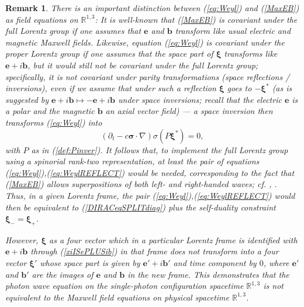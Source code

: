 \documentclass[11pt]{article}
\theoremstyle{definition}
\newtheorem{rem}[thm]{Remark}
\newcommand{\refeq}[1]{(\ref{#1})}
\numberwithin{equation}{section}
\newcommand{\bb}{\mathbf{b}}
\newcommand{\be}{\mathbf{e}}
\newcommand{\beq}{\begin{equation}}
\newcommand{\eeq}{\end{equation}}
\newcommand{\p}{\partial}
\newcommand{\siV}{\boldsymbol{\sigma}}
\newcommand{\xiV}{{\boldsymbol{\xi}}}
\newcommand{\Rset}{{\mathbb R}}
\newcommand{\si}{\sigma}
\newcommand{\nab}{\nabla}
\begin{document}
\begin{rem}\textit{
There is an important distinction between \refeq{eq:Weyl} and \refeq{MaxEB} as field equations on $\Rset^{1,3}$:
  It is well-known that \refeq{MaxEB} is covariant under the {\em full} Lorentz group if one assumes that $\be$ and $\bb$
transform like usual electric and magnetic Maxwell fields.
 Likewise, equation \refeq{eq:Weyl} is covariant under the proper Lorentz group if one assumes that the space part of $\xiV$ 
transforms like $\be+i\bb$, but it would still not be covariant under the full Lorentz group; specifically, it is not covariant 
under parity transformations (space reflections / inversions), even if we assume that under such a reflection $\xiV$ goes to 
$-\xiV^\ast$ (as is suggested by $\be+i\bb\mapsto-\be +i\bb$ under space inversions; recall that the electric $\be$ is a polar 
and the magnetic $\bb$ an axial vector field) --- a space inversion then transforms (\ref{eq:Weyl}) into 
\beq \label{eq:WeylREFLECT}
(\p_t - c \siV\cdot\nab) \si(P\xiV^\ast) = 0,
\eeq 
with $P$ as in \refeq{def:Pinver}. It follows that, to implement the full Lorentz group using a spinorial rank-two representation,
at least the \emph{pair} of equations \refeq{eq:Weyl},\refeq{eq:WeylREFLECT} would be needed, corresponding to the fact that 
\refeq{MaxEB} allows superpositions of both left- and right-handed waves; cf. {\rm \cite{Pen1976}, \cite{IBBphotonREV}}.
 Thus, in a given Lorentz frame, the pair \refeq{eq:Weyl},\refeq{eq:WeylREFLECT} would then be equivalent
to (\ref{DIRACeqSPLITdiag}) \emph{plus the self-duality constraint} $\xiV_- =\xiV_+$.}

\textit{ \emph{However}, $\xiV$ as a \emph{four vector} which in a particular Lorentz frame is identified with $\be + i\bb$ 
through (\ref{xiISePLUSib}) in that frame does not transform into a four vector $\xiV'$ whose space part is given by $\be' +i\bb'$ 
and time component by $0$, where $\be'$ and $\bb'$ are the images of $\be$ and $\bb$ in the new frame.
 This demonstrates that the photon wave equation on the single-photon configuration spacetime $\Rset^{1,3}$ is \emph{not} 
equivalent to the Maxwell field equations on physical spacetime $\Rset^{1,3}$.}
\end{rem}

\end{document}
